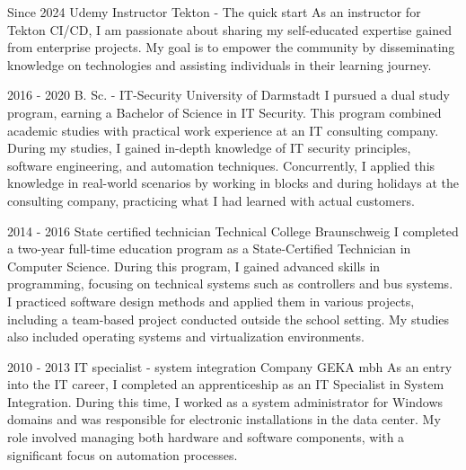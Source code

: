 
\cvmetaevent
{Since 2024}
{Udemy Instructor}
{Tekton - The quick start}
{As an instructor for Tekton CI/CD, I am passionate about sharing my self-educated expertise gained from enterprise projects. My goal is to empower the community by disseminating knowledge on technologies and assisting individuals in their learning journey.}

\cvmetaevent
{2016 - 2020}
{B. Sc. - IT-Security}
{University of Darmstadt}
{I pursued a dual study program, earning a Bachelor of Science in IT Security. This program combined academic studies with practical work experience at an IT consulting company. During my studies, I gained in-depth knowledge of IT security principles, software engineering, and automation techniques. Concurrently, I applied this knowledge in real-world scenarios by working in blocks and during holidays at the consulting company, practicing what I had learned with actual customers.}

\cvmetaevent
{2014 - 2016}
{State certified technician}
{Technical College Braunschweig}
{I completed a two-year full-time education program as a State-Certified Technician in Computer Science. During this program, I gained advanced skills in programming, focusing on technical systems such as controllers and bus systems. I practiced software design methods and applied them in various projects, including a team-based project conducted outside the school setting. My studies also included operating systems and virtualization environments.}

\newpage
\cvmetaevent
{2010 - 2013}
{IT specialist - system integration}
{Company GEKA mbh}
{As an entry into the IT career, I completed an apprenticeship as an IT Specialist in System Integration. During this time, I worked as a system administrator for Windows domains and was responsible for electronic installations in the data center. My role involved managing both hardware and software components, with a significant focus on automation processes.}
